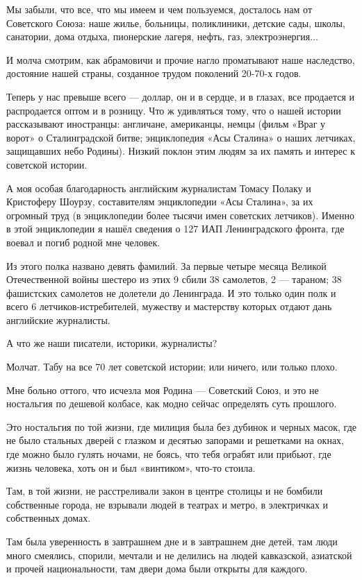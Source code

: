 \documentclass[a4paper,11pt]{extreport}
\begin{document}
Мы забыли, что все, что мы имеем и чем пользуемся, досталось нам от Советского
Союза: наше жилье, больницы, поликлиники, детские сады, школы, санатории, дома
отдыха, пионерские лагеря, нефть, газ, электроэнергия...

И молча смотрим, как абрамовичи и прочие нагло проматывают наше наследство,
достояние нашей страны, созданное трудом поколений 20-70-х годов.

Теперь у нас превыше всего --- доллар, он и в сердце, и в глазах, все продается и
распродается оптом и в розницу. Что ж удивляться тому, что о нашей истории
рассказывают иностранцы: англичане, американцы, немцы (фильм «Враг у ворот» о
Сталинградской битве; энциклопедия «Асы Сталина» о наших летчиках, защищавших
небо Родины). Низкий поклон этим людям за их память и интерес к советской
истории.

А моя особая благодарность английским журналистам Томасу Полаку и Кристоферу
Шоурзу, составителям энциклопедии «Асы Сталина», за их огромный труд (в
энциклопедии более тысячи имен советских летчиков). Именно в этой энциклопедии
я нашёл сведения о 127 ИАП Ленинградского фронта, где воевал и погиб родной мне
человек.

Из этого полка названо девять фамилий. За первые четыре месяца Великой
Отечественной войны шестеро из этих 9 сбили 38 самолетов, 2 --- тараном; 38
фашистских самолетов не долетели до Ленинграда. И это только один полк и всего
6 летчиков-истребителей, мужеству и мастерству которых отдают дань английские
журналисты.

А что же наши писатели, историки, журналисты?

Молчат. Табу на все 70 лет советской истории; или ничего, или только плохо.

Мне больно оттого, что исчезла моя Родина --- Советский Союз, и это не ностальгия
по дешевой колбасе, как модно сейчас определять суть прошлого.

Это ностальгия по той жизни, где милиция была без дубинок и черных масок, где
не было стальных дверей с глазком и десятью запорами и решетками на окнах, где
можно было гулять ночами, не боясь, что тебя ограбят или прибьют, где жизнь
человека, хоть он и был «винтиком», что-то стоила.

Там, в той жизни, не расстреливали закон в центре столицы и не бомбили
собственные города, не взрывали людей в театрах и метро, в электричках и
собственных домах.

Там была уверенность в завтрашнем дне и в завтрашнем дне детей, там люди много
смеялись, спорили, мечтали и не делились на людей кавказской, азиатской и
прочей национальности, там двери дома были открыты для каждого.
\end{document}

